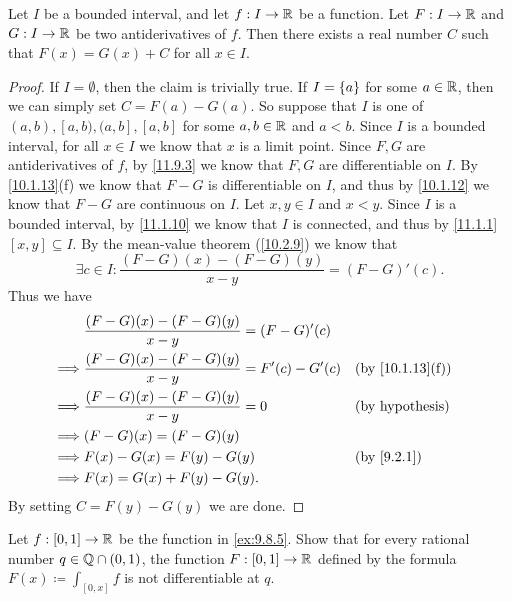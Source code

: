 \begin{lem}\label{11.9.5}
  Let \(I\) be a bounded interval, and let \(f : I \to \mathbb{R}\) be a function.
  Let \(F : I \to \mathbb{R}\) and \(G : I \to \mathbb{R}\) be two antiderivatives of \(f\).
  Then there exists a real number \(C\) such that \(F(x) = G(x) + C\) for all \(x \in I\).
\end{lem}

\begin{proof}
  If \(I = \emptyset\), then the claim is trivially true.
  If \(I = \left\lbrace a\right\rbrace\) for some \(a \in \mathbb{R}\), then we can simply set \(C = F(a) - G(a)\).
  So suppose that \(I\) is one of \((a, b), [a, b), (a, b], [a, b]\) for some \(a, b \in \mathbb{R}\) and \(a < b\).
  Since \(I\) is a bounded interval, for all \(x \in I\) we know that \(x\) is a limit point.
  Since \(F, G\) are antiderivatives of \(f\), by \cref{11.9.3} we know that \(F, G\) are differentiable on \(I\).
  By \cref{10.1.13}(f) we know that \(F - G\) is differentiable on \(I\), and thus by \cref{10.1.12} we know that \(F - G\) are continuous on \(I\).
  Let \(x, y \in I\) and \(x < y\).
  Since \(I\) is a bounded interval, by \cref{11.1.10} we know that \(I\) is connected, and thus by \cref{11.1.1} \([x, y] \subseteq I\).
  By the mean-value theorem (\cref{10.2.9}) we know that
  \[
    \exists c \in I : \dfrac{(F - G)(x) - (F - G)(y)}{x - y} = (F - G)'(c).
  \]
  Thus we have
  \begin{align*}
             & \dfrac{(F - G)(x) - (F - G)(y)}{x - y} = (F - G)'(c)                                      \\
    \implies & \dfrac{(F - G)(x) - (F - G)(y)}{x - y} = F'(c) - G'(c) &  & \text{(by \cref{10.1.13}(f))} \\
    \implies & \dfrac{(F - G)(x) - (F - G)(y)}{x - y} = 0             &  & \text{(by hypothesis)}        \\
    \implies & (F - G)(x) = (F - G)(y)                                                                   \\
    \implies & F(x) - G(x) = F(y) - G(y)                              &  & \by{9.2.1}                    \\
    \implies & F(x) = G(x) + F(y) - G(y).
  \end{align*}
  By setting \(C = F(y) - G(y)\) we are done.
\end{proof}

\exercisesection

\begin{ex}\label{ex:11.9.1}
  Let \(f : [0, 1] \to \mathbb{R}\) be the function in \cref{ex:9.8.5}.
  Show that for every rational number \(q \in \mathbb{Q} \cap (0, 1)\), the function \(F : [0, 1] \to \mathbb{R}\) defined by the formula \(F(x) \coloneqq \int_{[0, x]} f\) is not differentiable at \(q\).
\end{ex}

